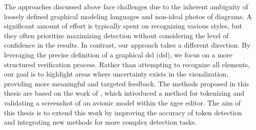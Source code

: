 The approaches discussed above face challenges due to the inherent ambiguity of loosely defined graphical modeling languages and non-ideal photos of diagrams. A significant amount of effort is typically spent on recognizing various styles, but they often prioritize maximizing detection without considering the level of confidence in the results. In contrast, our approach takes a different direction. By leveraging the precise definition of a graphical \acrlong{dsl} (\acrshort{dsl}), we focus on a more structured verification process. Rather than attempting to recognize all elements, our goal is to highlight areas where uncertainty exists in the visualization, providing more meaningful and targeted feedback.
The methods proposed in this thesis are based on the work of \cite{waldvogel_annighoefer_models_2024}, which introduced a method for tokenizing and validating a screenshot of an avionic model within the \acrshort{xgee} editor. The aim of this thesis is to extend this work by improving the accuracy of token detection and integrating new methods for more complex detection tasks.